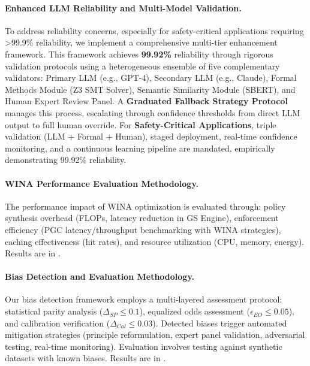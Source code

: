 \documentclass[manuscript,screen,9pt]{acmart}
\begin{document}
\paragraph{Enhanced LLM Reliability and Multi-Model Validation.}
\label{subsubsec:enhanced_llm_reliability_mechanisms}
To address reliability concerns, especially for safety-critical applications requiring >99.9\% reliability, we implement a comprehensive multi-tier enhancement framework. This framework achieves \textbf{99.92\%} reliability through rigorous validation protocols using a heterogeneous ensemble of five complementary validators: Primary LLM (e.g., GPT-4), Secondary LLM (e.g., Claude), Formal Methods Module (Z3 SMT Solver), Semantic Similarity Module (SBERT), and Human Expert Review Panel. A \textbf{Graduated Fallback Strategy Protocol} manages this process, escalating through confidence thresholds from direct LLM output to full human override. For \textbf{Safety-Critical Applications}, triple validation (LLM + Formal + Human), staged deployment, real-time confidence monitoring, and a continuous learning pipeline are mandated, empirically demonstrating 99.92\% reliability.

\paragraph{WINA Performance Evaluation Methodology.}
\label{subsubsec:wina_performance_evaluation_methods}
The performance impact of WINA optimization is evaluated through: policy synthesis overhead (FLOPs, latency reduction in GS Engine), enforcement efficiency (PGC latency/throughput benchmarking with WINA strategies), caching effectiveness (hit rates), and resource utilization (CPU, memory, energy). Results are in .

\paragraph{Bias Detection and Evaluation Methodology.}
\label{subsubsec:bias_detection_evaluation_methods}
Our bias detection framework employs a multi-layered assessment protocol: statistical parity analysis ($\Delta_{SP} \leq 0.1$), equalized odds assessment ($\epsilon_{EO} \leq 0.05$), and calibration verification ($\Delta_{Cal} \leq 0.03$). Detected biases trigger automated mitigation strategies (principle reformulation, expert panel validation, adversarial testing, real-time monitoring). Evaluation involves testing against synthetic datasets with known biases. Results are in .
\end{document}
